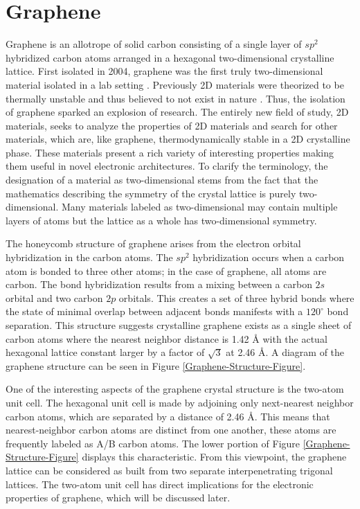 \section{Graphene}
Graphene is an allotrope of solid carbon consisting of a single layer of $sp^2$ hybridized carbon atoms arranged in a hexagonal two-dimensional crystalline lattice. First isolated in 2004, graphene was the first truly two-dimensional material isolated in a lab setting \cite{apsnews}. Previously 2D materials were theorized to be thermally unstable and thus believed to not exist in nature \cite{Geim}. Thus, the isolation of graphene sparked an explosion of research. The entirely new field of study, 2D materials, seeks to analyze the properties of 2D materials and search for other materials, which are, like graphene, thermodynamically stable in a 2D crystalline phase. These materials present a rich variety of interesting properties making them useful in novel electronic architectures. To clarify the terminology, the designation of a material as two-dimensional stems from the fact that the mathematics describing the symmetry of the crystal lattice is purely two-dimensional. Many materials labeled as two-dimensional may contain multiple layers of atoms but the lattice as a whole has two-dimensional symmetry.

The honeycomb structure of graphene arises from the electron orbital hybridization in the carbon atoms. The $sp^2$ hybridization occurs when a carbon atom is bonded to three other atoms; in the case of graphene, all atoms are carbon. The bond hybridization results from a mixing between a carbon $2s$ orbital and two carbon $2p$ orbitals. This creates a set of three hybrid bonds where the state of minimal overlap between adjacent bonds manifests with a $120^\circ$ bond separation. This structure suggests crystalline graphene exists as a single sheet of carbon atoms where the nearest neighbor distance is 1.42 {\AA} with the actual hexagonal lattice constant larger by a factor of $\sqrt{3}$ at 2.46 {\AA}.  A diagram of the graphene structure can be seen in Figure \ref{Graphene-Structure-Figure}.

One of the interesting aspects of the graphene crystal structure is the two-atom unit cell. The hexagonal unit cell is made by adjoining only next-nearest neighbor carbon atoms, which are separated by a distance of 2.46 {\AA}. This means that nearest-neighbor carbon atoms are distinct from one another, these atoms are frequently labeled as A/B carbon atoms.  The lower portion of Figure \ref{Graphene-Structure-Figure} displays this characteristic. From this viewpoint, the graphene lattice can be considered as built from two separate interpenetrating trigonal lattices. The two-atom unit cell has direct implications for the electronic properties of graphene, which will be discussed later.

